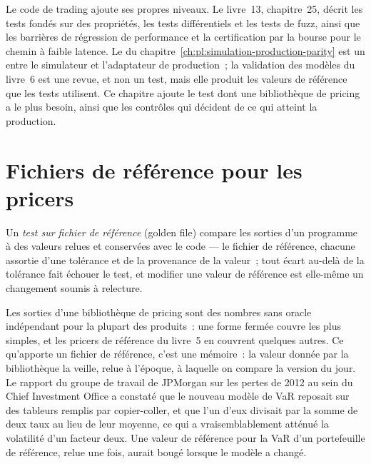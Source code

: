 Le code de trading ajoute ses propres niveaux. Le livre~13, chapitre~25, décrit les tests fondés sur des propriétés, les tests différentiels et les tests de fuzz, ainsi que les barrières de régression de performance
et la certification par la bourse pour le chemin à faible latence. Le  du chapitre~\ref{ch:pl:simulation-production-parity} est un 
entre le simulateur et l'adaptateur de production~; la validation des modèles du livre~6 est une revue, et non un test, mais elle produit les valeurs de référence que les tests
utilisent. Ce chapitre ajoute le test dont une bibliothèque de pricing a le plus besoin, ainsi que les contrôles qui décident de ce qui atteint la production.

\section{Fichiers de référence pour les pricers}

\begin{definition}\label{def:pl:testing-and-continuous-delivery:golden}
Un \emph{test sur fichier de référence} (golden file) compare les sorties d'un programme à des valeurs relues et conservées avec le code --- le
fichier de référence, chacune assortie d'une tolérance et de la provenance de la valeur~; tout écart au-delà de la tolérance fait échouer le test, et modifier une valeur de référence
est elle-même un changement soumis à relecture.
\end{definition}

Les sorties d'une bibliothèque de pricing sont des nombres sans oracle indépendant pour la plupart des produits~: une forme fermée couvre les plus simples, et les
pricers de référence du livre~5 en couvrent quelques autres. Ce qu'apporte un fichier de référence, c'est une mémoire~: la valeur donnée par la bibliothèque la veille, relue à l'époque, à laquelle
on compare la version du jour. Le rapport du groupe de travail de JPMorgan sur les pertes de 2012 au sein du Chief Investment Office a constaté que le nouveau modèle de VaR reposait
sur des tableurs remplis par copier-coller, et que l'un d'eux divisait par la somme de deux taux au lieu de leur moyenne, ce qui
a vraisemblablement atténué la volatilité d'un facteur deux. Une valeur de référence pour la VaR d'un portefeuille de référence, relue une fois, aurait bougé lorsque le
modèle a changé.

